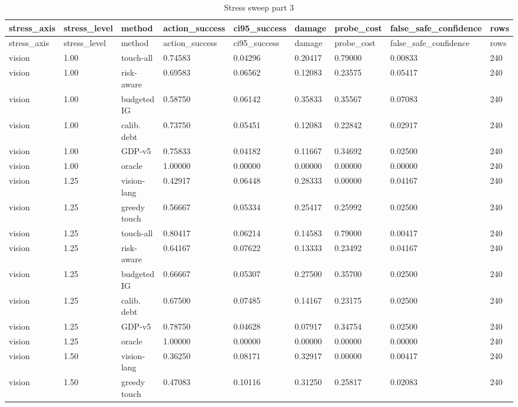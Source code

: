 \documentclass{article}
\begin{document}
\begin{center}
\tiny
\renewcommand{\arraystretch}{0.92}
\setlength{\tabcolsep}{3pt}
\begin{longtable}{lllllllll}
\caption{Stress sweep part 3}\label{tab:stress-sweep-3}\\
\toprule
stress\_axis & stress\_level & method & action\_success & ci95\_success & damage & probe\_cost & false\_safe\_confidence & rows \\
\midrule
\endfirsthead
\toprule
stress\_axis & stress\_level & method & action\_success & ci95\_success & damage & probe\_cost & false\_safe\_confidence & rows \\
\midrule
\endhead
vision & 1.00 & touch-all & 0.74583 & 0.04296 & 0.20417 & 0.79000 & 0.00833 & 240 \\
vision & 1.00 & risk-aware & 0.69583 & 0.06562 & 0.12083 & 0.23575 & 0.05417 & 240 \\
vision & 1.00 & budgeted IG & 0.58750 & 0.06142 & 0.35833 & 0.35567 & 0.07083 & 240 \\
vision & 1.00 & calib. debt & 0.73750 & 0.05451 & 0.12083 & 0.22842 & 0.02917 & 240 \\
vision & 1.00 & GDP-v5 & 0.75833 & 0.04182 & 0.11667 & 0.34692 & 0.02500 & 240 \\
vision & 1.00 & oracle & 1.00000 & 0.00000 & 0.00000 & 0.00000 & 0.00000 & 240 \\
vision & 1.25 & vision-lang & 0.42917 & 0.06448 & 0.28333 & 0.00000 & 0.04167 & 240 \\
vision & 1.25 & greedy touch & 0.56667 & 0.05334 & 0.25417 & 0.25992 & 0.02500 & 240 \\
vision & 1.25 & touch-all & 0.80417 & 0.06214 & 0.14583 & 0.79000 & 0.00417 & 240 \\
vision & 1.25 & risk-aware & 0.64167 & 0.07622 & 0.13333 & 0.23492 & 0.04167 & 240 \\
vision & 1.25 & budgeted IG & 0.66667 & 0.05307 & 0.27500 & 0.35700 & 0.02500 & 240 \\
vision & 1.25 & calib. debt & 0.67500 & 0.07485 & 0.14167 & 0.23175 & 0.02500 & 240 \\
vision & 1.25 & GDP-v5 & 0.78750 & 0.04628 & 0.07917 & 0.34754 & 0.02500 & 240 \\
vision & 1.25 & oracle & 1.00000 & 0.00000 & 0.00000 & 0.00000 & 0.00000 & 240 \\
vision & 1.50 & vision-lang & 0.36250 & 0.08171 & 0.32917 & 0.00000 & 0.00417 & 240 \\
vision & 1.50 & greedy touch & 0.47083 & 0.10116 & 0.31250 & 0.25817 & 0.02083 & 240 \\

\end{longtable}
\end{center}
\end{document}

